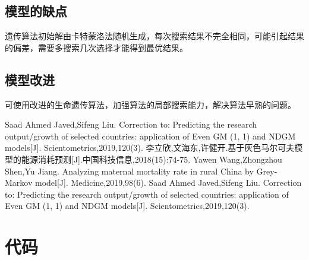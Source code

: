 \documentclass{whutmod}
\begin{document}
	\subsection{模型的缺点}
	
	遗传算法初始解由卡特蒙洛法随机生成，每次搜索结果不完全相同，可能引起结果的偏差，需要多搜索几次选择才能得到最优结果。
	\subsection{模型改进}
	可使用改进的生命遗传算法，加强算法的局部搜索能力，解决算法早熟的问题。

 
	\newpage	%
	\nocite{*}		%
%
%	
\begin{thebibliography}{9}%
	Saad Ahmed Javed,Sifeng Liu. Correction to: Predicting the research output/growth of selected countries: application of Even GM (1, 1) and NDGM models[J]. Scientometrics,2019,120(3).
	李立欣,文海东,许健开.基于灰色马尔可夫模型的能源消耗预测[J].中国科技信息,2018(15):74-75.	
	Yawen Wang,Zhongzhou Shen,Yu Jiang. Analyzing maternal mortality rate in rural China by Grey-Markov model[J]. Medicine,2019,98(6).
	Saad Ahmed Javed,Sifeng Liu. Correction to: Predicting the research output/growth of selected countries: application of Even GM (1, 1) and NDGM models[J]. Scientometrics,2019,120(3).

\end{thebibliography}

	\newpage
	\appendix %

\section{代码}
\end{document}
